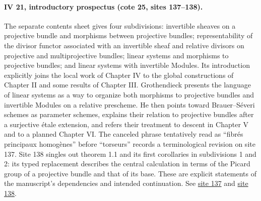 \paragraph{IV 21, introductory prospectus (cote 25, sites 137--138).}
The separate contents sheet gives four subdivisions: invertible sheaves on a projective bundle and morphisms between projective bundles; representability of the divisor functor associated with an invertible sheaf and relative divisors on projective and multiprojective bundles; linear systems and morphisms to projective bundles; and linear systems with invertible Modules. Its introduction explicitly joins the local work of Chapter IV to the global constructions of Chapter II and some results of Chapter III. Grothendieck presents the language of linear systems as a way to organize both morphisms to projective bundles and invertible Modules on a relative prescheme. He then points toward Brauer--Séveri schemes as parameter schemes, explains their relation to projective bundles after a surjective étale extension, and refers their treatment to descent in Chapter V and to a planned Chapter VI. The canceled phrase tentatively read as ``fibrés principaux homogènes'' before ``torseurs'' records a terminological revision on site 137. Site 138 singles out theorem 1.1 and its first corollaries in subdivisions 1 and 2: its typed replacement describes the central calculation in terms of the Picard group of a projective bundle and that of its base. These are explicit statements of the manuscript's dependencies and intended continuation. See \href{https://grothendieck.umontpellier.fr/web/viewer.html?file=../25.pdf#page=138}{site 137} and \href{https://grothendieck.umontpellier.fr/web/viewer.html?file=../25.pdf#page=139}{site 138}.
